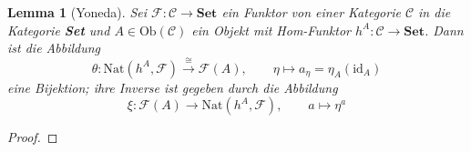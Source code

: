 \documentclass[a4paper, 11pt]{scrartcl}
\newcommand{\Hom}{\text{Hom}}
\newcommand{\id}{\text{id}}
\newcommand{\Ob}{\text{Ob}}
\theoremstyle{basicstyle}
\newtheorem{lemma}[definition]{Lemma}
\begin{document}
    \begin{lemma}[Yoneda]\label{lem:yoneda}
        Sei \(\mathcal{F}: \mathcal{C} \to \textbf{Set}\) ein Funktor von einer Kategorie \(\mathcal{C}\) in die Kategorie \textbf{Set} und \(A \in \Ob(\mathcal{C})\) ein Objekt mit Hom-Funktor \(h^A : \mathcal{C} \to \textbf{Set}\).
        Dann ist die Abbildung
        \[\theta : \text{Nat}(h^A, \mathcal{F}) \overset{\cong}{\longrightarrow} \mathcal{F}(A), \qquad \eta \mapsto a_{\eta} = \eta_A(\id_A)\]
        eine Bijektion; ihre Inverse ist gegeben durch die Abbildung
        \[\xi : \mathcal{F}(A) \longrightarrow \text{Nat}(h^A, \mathcal{F}), \qquad a \mapsto \eta^a\]
    \end{lemma}
    \begin{proof}
    \end{proof}
\end{document}

